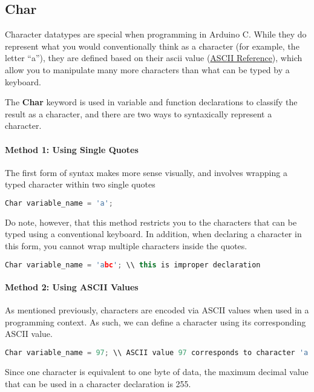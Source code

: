    \subsection{Char}
    Character datatypes are special when programming in Arduino C. While they do represent what you would conventionally think as a character (for example, the letter \enquote{a}),
    they are defined based on their ascii value (\href{https://en.cppreference.com/w/cpp/language/ascii}{ASCII Reference}), which allow you to manipulate many more characters than
    what can be typed by a keyboard.

    The \textbf{Char} keyword is used in variable and function declarations to classify the result as a character, and there are two ways to syntaxically represent a character.
    \paragraph*{Method 1: Using Single Quotes} The first form of syntax makes more sense visually, and involves wrapping a typed character within two single quotes
    \begin{lstlisting}[linewidth=1.5\textwidth, language=C++]
        Char variable_name = 'a';\end{lstlisting}
    Do note, however, that this method restricts you to the characters that can be typed using a conventional keyboard. In addition, when declaring a character in this form, you
    cannot wrap multiple characters inside the quotes.
    \begin{lstlisting}[linewidth=1.5\textwidth, language=C++]
        Char variable_name = 'abc'; \\ this is improper declaration \end{lstlisting}
    \paragraph*{Method 2: Using ASCII Values} As mentioned previously, characters are encoded via ASCII values when used in a programming context. As such, we can define a
    character using its corresponding ASCII value.
    \begin{lstlisting}[linewidth=1.5\textwidth, language=C++]
        Char variable_name = 97; \\ ASCII value 97 corresponds to character 'a'\end{lstlisting}
    Since one character is equivalent to one byte of data, the maximum decimal value that can be used in a character declaration is 255.

